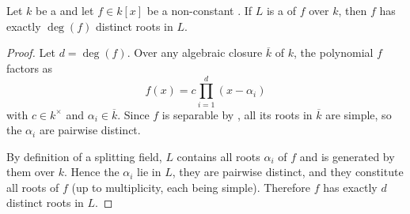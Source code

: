 \begin{lemma} \label{lemma:separable_polynomial_has_distinct_roots_in_any_splitting_field}
    Let $k$ be a  and let $f \in k[x]$ be a non-constant . If $L$ is a  of $f$ over $k$, then $f$ has exactly $\deg(f)$ distinct roots in $L$.
\end{lemma}
\begin{proof}
    Let $d = \deg(f)$. Over any algebraic closure $\overline{k}$ of $k$, the polynomial $f$ factors as
    $$f(x) = c \prod_{i=1}^d (x - \alpha_i)$$
    with $c \in k^\times$ and $\alpha_i \in \overline{k}$. Since $f$ is separable by , all its roots in $\overline{k}$ are simple, so the $\alpha_i$ are pairwise distinct.

    By definition of a splitting field, $L$ contains all roots $\alpha_i$ of $f$ and is generated by them over $k$. Hence the $\alpha_i$ lie in $L$, they are pairwise distinct, and they constitute all roots of $f$ (up to multiplicity, each being simple). Therefore $f$ has exactly $d$ distinct roots in $L$.
\end{proof}